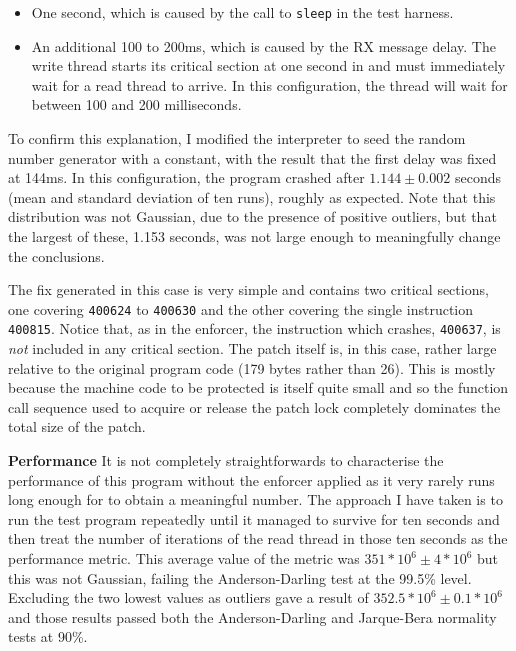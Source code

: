 \begin{itemize}
\item One second, which is caused by the call to \verb|sleep| in the
  test harness.
\item An additional 100 to 200ms, which is caused by the RX message
  delay.  The write thread starts its critical section at one second
  in and must immediately wait for a read thread to arrive.  In this
  configuration, the thread will wait for between 100 and 200
  milliseconds.
\end{itemize}

To confirm this explanation, I modified the interpreter to seed the
random number generator with a constant, with the result that the
first delay was fixed at 144ms.  In this configuration, the program
crashed after $1.144 \pm 0.002$ seconds (mean and standard deviation
of ten runs), roughly as expected.  Note that this distribution was
not Gaussian, due to the presence of positive outliers, but that the
largest of these, 1.153 seconds, was not large enough to meaningfully
change the conclusions.  

The fix generated in this case is very simple and contains two
critical sections, one covering \verb|400624| to \verb|400630| and the
other covering the single instruction \verb|400815|.  Notice that, as
in the enforcer, the instruction which crashes, \verb|400637|, is
\emph{not} included in any critical section.  The patch itself is, in
this case, rather large relative to the original program code (179
bytes rather than 26).  This is mostly because the machine code to be
protected is itself quite small and so the function call sequence used
to acquire or release the patch lock completely dominates the total
size of the patch.

\textbf{Performance} It is not completely straightforwards to
characterise the performance of this program without the enforcer
applied as it very rarely runs long enough for to obtain a meaningful
number.  The approach I have taken is to run the test program
repeatedly until it managed to survive for ten seconds and then treat
the number of iterations of the read thread in those ten seconds as
the performance metric.  This average value of the metric was
$351*10^6 \pm 4*10^6$ but this was not Gaussian, failing the
Anderson-Darling test at the 99.5\% level.  Excluding the two lowest
values as outliers gave a result of $352.5 * 10^6 \pm 0.1 * 10^6$ and
those results passed both the Anderson-Darling and Jarque-Bera
normality tests at 90\%.

